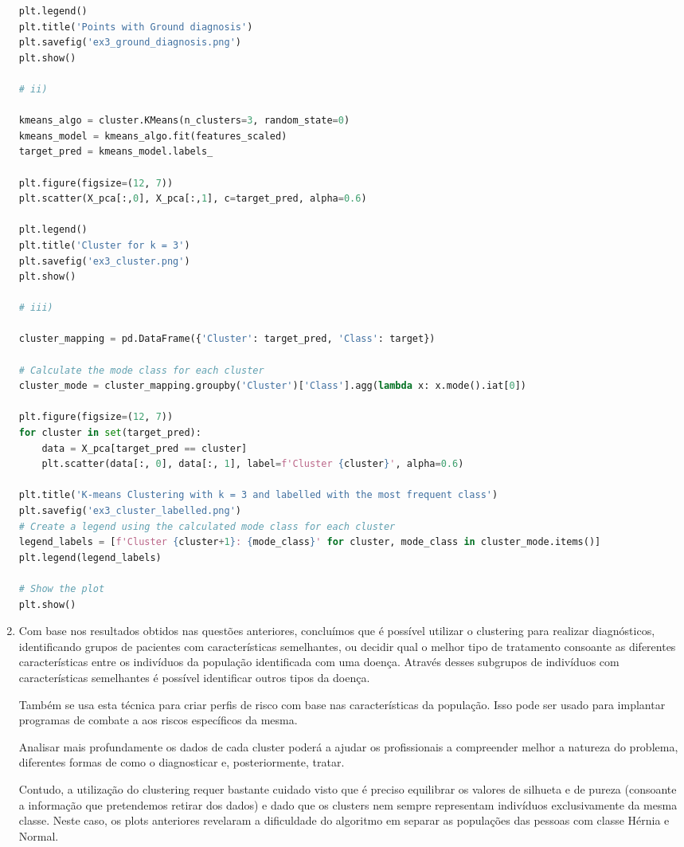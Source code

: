 \documentclass[a4paper,12pt]{article} %
\begin{document}
\begin{enumerate}
\begin{lstlisting}[language=Python]
plt.legend()
plt.title('Points with Ground diagnosis')
plt.savefig('ex3_ground_diagnosis.png')
plt.show()

# ii)

kmeans_algo = cluster.KMeans(n_clusters=3, random_state=0)
kmeans_model = kmeans_algo.fit(features_scaled)
target_pred = kmeans_model.labels_

plt.figure(figsize=(12, 7))
plt.scatter(X_pca[:,0], X_pca[:,1], c=target_pred, alpha=0.6)

plt.legend()
plt.title('Cluster for k = 3')
plt.savefig('ex3_cluster.png')
plt.show()

# iii)

cluster_mapping = pd.DataFrame({'Cluster': target_pred, 'Class': target})

# Calculate the mode class for each cluster
cluster_mode = cluster_mapping.groupby('Cluster')['Class'].agg(lambda x: x.mode().iat[0])

plt.figure(figsize=(12, 7))
for cluster in set(target_pred):
    data = X_pca[target_pred == cluster]
    plt.scatter(data[:, 0], data[:, 1], label=f'Cluster {cluster}', alpha=0.6)

plt.title('K-means Clustering with k = 3 and labelled with the most frequent class') 
plt.savefig('ex3_cluster_labelled.png')
# Create a legend using the calculated mode class for each cluster
legend_labels = [f'Cluster {cluster+1}: {mode_class}' for cluster, mode_class in cluster_mode.items()]
plt.legend(legend_labels)

# Show the plot
plt.show()
\end{lstlisting}

\item 

Com base nos resultados obtidos nas questões anteriores, concluímos que é possível utilizar o clustering para realizar diagnósticos, identificando grupos de pacientes com características semelhantes, ou decidir qual o melhor tipo de tratamento 
consoante as diferentes características entre os indivíduos da população identificada com uma doença. Através desses subgrupos de indivíduos com características semelhantes é possível identificar outros tipos da doença.

Também se usa esta técnica para criar perfis de risco com base nas características da população. Isso pode ser usado para implantar programas de combate a aos riscos específicos da mesma.

Analisar mais profundamente os dados de cada cluster poderá a ajudar os profissionais a compreender melhor a natureza do problema, diferentes formas de como o diagnosticar e, posteriormente, tratar.

Contudo, a utilização do clustering requer bastante cuidado visto que é preciso equilibrar os valores de silhueta e de pureza (consoante a informação que pretendemos retirar dos dados) e dado que os clusters nem sempre representam indivíduos exclusivamente da mesma classe. Neste caso, os plots anteriores revelaram a dificuldade do algoritmo em separar as populações das pessoas com classe Hérnia e Normal.

\end{enumerate}
\end{document}
